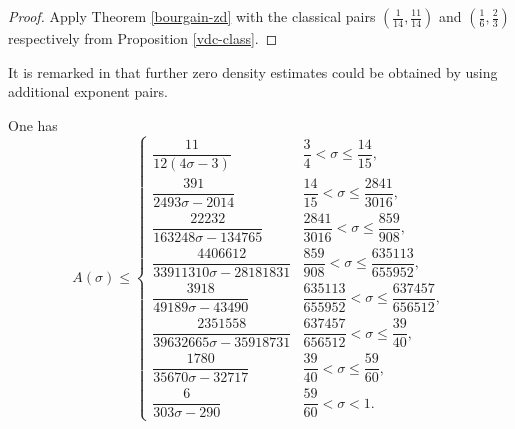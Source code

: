 \literature
{}

\begin{proof} Apply Theorem \ref{bourgain-zd} with the classical pairs $(\frac{1}{14},\frac{11}{14})$ and $(\frac{1}{6}, \frac{2}{3})$ respectively from Proposition \ref{vdc-class}.
\end{proof}

It is remarked in \cite{bourgain_remarks_1995} that further zero density estimates could be obtained by using additional exponent pairs.

\begin{corollary}\label{bourgain-zero-density-optimized} One has
\[
A(\sigma) \leq \begin{cases}
\dfrac{11}{12 \left(4 \sigma - 3\right)} & \dfrac{3}{4} < \sigma \le \dfrac{14}{15},\\
\dfrac{391}{2493 \sigma - 2014} & \dfrac{14}{15} < \sigma \le \dfrac{2841}{3016},\\
\dfrac{22232}{163248 \sigma - 134765} & \dfrac{2841}{3016} < \sigma \le \dfrac{859}{908},\\
\dfrac{4406612}{33911310 \sigma - 28181831} & \dfrac{859}{908} < \sigma \le \dfrac{635113}{655952},\\
\dfrac{3918}{49189 \sigma - 43490} & \dfrac{635113}{655952} < \sigma \le \dfrac{637457}{656512},\\
\dfrac{2351558}{39632665 \sigma - 35918731} & \dfrac{637457}{656512} < \sigma \le \dfrac{39}{40},\\
\dfrac{1780}{35670 \sigma - 32717} & \dfrac{39}{40} < \sigma \le \dfrac{59}{60},\\
\dfrac{6}{303 \sigma - 290} & \dfrac{59}{60} < \sigma < 1.
\end{cases}
\]
\end{corollary}
